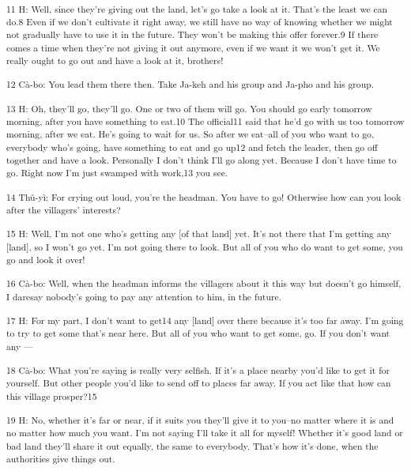 {\textsuperscript{11 H: Well, since they're giving out the land, let's go
take a look at it. That's the least we can do.8 Even if we don't cultivate it right
away, we still have no way of knowing whether we might not gradually have to use
it in the future. They won't be making this offer forever.9 If there comes a time
when they're not giving it out anymore, even if we want it we won't get it. We
really ought to go out and have a look at it, brothers!}}

{\textsuperscript{12 Cà-bo: You lead them there then. Take Ja-keh and his
group and Ja-pho and his group.}}

{\textsuperscript{13 H: Oh, they'll go, they'll go. One or two of them will
go. You should go early tomorrow morning, after you have something to eat.10 The
official11 said that he'd go with us too tomorrow morning, after we eat. He's going
to wait for us. So after we eat--all of you who want to go, everybody who's going,
have something to eat and go up12 and fetch the leader, then go off together and
have a look. Personally I don't think I'll go along yet. Because I don't have time
to go. Right now I'm just swamped with work,13 you see.}}

{\textsuperscript{14 Thû-yì: For crying out loud, you're the headman.
You have to go! Otherwise how can you look after the villagers' interests?}}

{\textsuperscript{15 H: Well, I'm not one who's getting any [of that land]
yet. It's not there that I'm getting any [land], so I won't go yet. I'm not going
there to look. But all of you who do want to get some, you go and look it over!
}}

{\textsuperscript{16 Cà-bo: Well, when the headman informs the villagers
about it this way but doesn't go himself, I daresay nobody's going to pay any attention
to him, in the future. }}

{\textsuperscript{17 H: For my part, I don't want to get14 any [land] over
there because it's too far away. I'm going to try to get some that's near here.
But all of you who want to get some, go. If you don't want any ---}}

{\textsuperscript{18 Cà-bo: What you're saying is really very selfish.
If it's a place nearby you'd like to get it for yourself. But other people you'd
like to send off to places far away. If you act like that how can this village
prosper?15}}

{\textsuperscript{19 H: No, whether it's far or near, if it suits you they'll
give it to you--no matter where it is and no matter how much you want. I'm not
saying I'll take it all for myself! Whether it's good land or bad land they'll
share it out equally, the same to everybody. That's how it's done, when the authorities
give things out. }}

